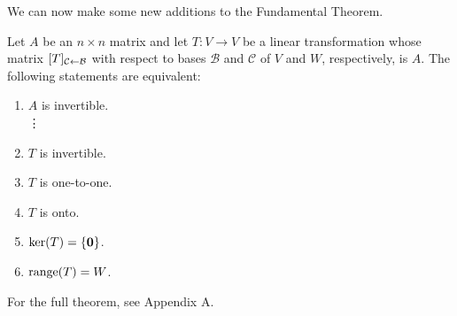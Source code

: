 \documentclass[../m73main.tex]{subfiles}
\begin{document}
We can now make some new additions to the Fundamental Theorem.

\begin{theorem}
	Let $A$ be an $n\times n$ matrix and let $T : V \to V$ be a linear transformation whose matrix $[T]_{\mathcal{C} \leftarrow \mathcal{B}}$ with respect to bases $\mathcal{B}$ and $\mathcal{C}$ of $V$ and $W$, respectively, is $A$.
	The following statements are equivalent:
	\begin{enumerate}[label=(\alph*)]
		\item $A$ is invertible. \\
		\phantom{~}\hspace{-19.5pt} \vdots
		\setcounter{enumi}{15}
		\item $T$ is invertible.
		\item $T$ is one-to-one.
		\item $T$ is onto.
		\item $\textrm{ker}(T) = \{\mathbf{0}\}$.
		\item $\textrm{range}(T) = W$.
	\end{enumerate}
	For the full theorem, see Appendix A.
\end{theorem}
\end{document}
